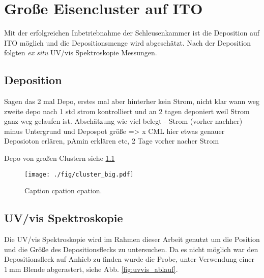 \chapter{Große Eisencluster auf ITO}
Mit der erfolgreichen Inbetriebnahme der Schleusenkammer ist die Deposition auf ITO möglich und die Depositionsmenge wird abgeschätzt.
Nach der Deposition folgten \textit{ex situ} UV/vis Spektroskopie Messungen. 


\section{Deposition}



Sagen das 2 mal Depo, erstes mal aber hinterher kein Strom, nicht klar wann weg
zweite depo nach 1 std strom kontrolliert und an 2 tagen deponiert weil Strom ganz weg gelaufen ist.
Abschätzung wie viel belegt - Strom (vorher nachher) minus Untergrund und Depospot größe => x CML
hier etwas genauer Deposioton erlären, pAmin erklären etc, 2 Tage vorher nacher Strom 

Depo von großen Clustern siehe \ref{fig:cluster_big}
\begin{figure}
    \centering
    \texttt{[image: ./fig/cluster\_big.pdf]}
    \caption{Caption cpation cpation.}
    \label{fig:cluster_big}
\end{figure}

\section{UV/vis Spektroskopie}
Die UV/vis Spektroskopie wird im Rahmen dieser Arbeit genutzt um die Position und die Größe des Depositionsflecks zu untersuchen.
Da es nicht möglich war den Depositionsfleck auf Anhieb zu finden wurde die Probe, unter Verwendung einer $\SI{1}{\mm}$ Blende abgerastert, siehe Abb. \ref{fig:uvvis_ablauf}.

